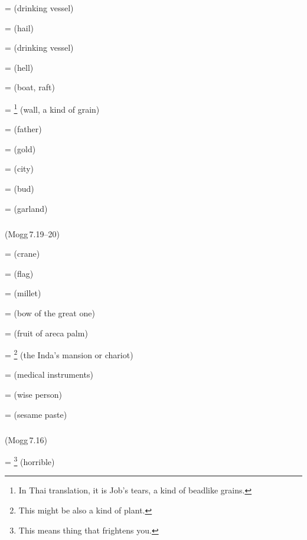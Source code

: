 =  (drinking vessel)\par
{} =  (hail)\par
{} =  (drinking vessel)\par
{} =  (hell)\par
{} =  (boat, raft)\par
{} = \footnote{In Thai translation, it is Job's tears, a kind of beadlike grains.} (wall, a kind of grain)\par
{} =  (father)\par
{} =  (gold)\par
{} =  (city)\par
{} =  (bud)\par
{} =  (garland)\par

\subparagraph*{} (Mogg\,7.19--20)\label{pacckx:aaka}

 =  (crane)\par
{} =  (flag)\par
{} =  (millet)\par
{} =  (bow of the great one)\par
{} =  (fruit of areca palm)\par
{} = \footnote{ This might be also a kind of plant.} (the Inda's mansion or chariot)\par
{} =  (medical instruments)\par
{} =  (wise person)\par
{} =  (sesame paste)\par

\subparagraph*{} (Mogg\,7.16)\label{pacckx:aanaka}

 = \footnote{ This means thing that frightens you.} (horrible)\par


